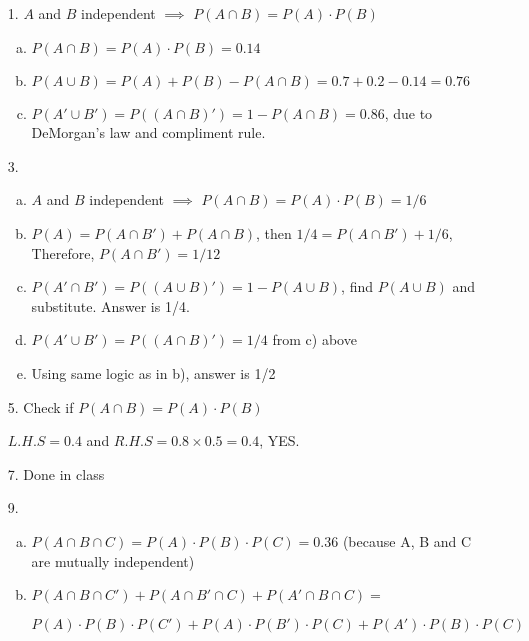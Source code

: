 \documentclass{article}\usepackage[]{graphicx}\usepackage[]{color}
\begin{document}
\begin{itemize}
    \item [1.] $A$ and $B$ independent $\implies$ $P(A \cap B) = P(A)\cdot P(B)$
    \begin{enumerate}[(a)]
        \item $P(A \cap B) = P(A)\cdot P(B) = 0.14$
        \item $P(A \cup B) = P(A)+ P(B) - P(A \cap B) = 0.7+0.2-0.14 = 0.76$
        \item $P(A'\cup B') = P((A\cap B)') = 1-P(A \cap B) = 0.86$, due to DeMorgan's law and compliment rule.
    \end{enumerate}
    
    \item [3.] \begin{enumerate}[(a)]
        \item $A$ and $B$ independent $\implies$ $P(A \cap B) = P(A)\cdot P(B) = 1/6$
        \item $P(A) = P(A\cap B') + P(A \cap B)$, then
        $1/4 = P(A\cap B') + 1/6$,
        Therefore, $P(A\cap B') = 1/12$
        
        \item $P(A'\cap B') = P((A \cup B)') = 1 - P(A\cup B)$, find $P(A\cup B)$ and substitute. Answer is 1/4.
        
        \item $P(A'\cup B') = P((A \cap B)') = 1/4$ from c) above
        
        \item Using same logic as in b), answer is 1/2 
    \end{enumerate}
    
    \item [5.] Check if $P(A\cap B) = P(A)\cdot P(B)$
    
    $L.H.S = 0.4$ and $R.H.S = 0.8\times 0.5 = 0.4$, YES.
    
    \item [7.] Done in class
    
    \item [9.] \begin{enumerate}[(a)]
        \item $P(A \cap B \cap C) = P(A)\cdot P(B)\cdot P(C) = 0.36$ (because A, B and C are mutually independent)
        
        \item $P(A \cap B \cap C') + P(A \cap B' \cap C) + P(A' \cap B \cap C)  = $
        
        $P(A)\cdot P(B)\cdot P(C') + P(A)\cdot P(B')\cdot P(C) + P(A')\cdot P(B)\cdot P(C)$
        

\end{enumerate}
\end{itemize}
\end{document}
